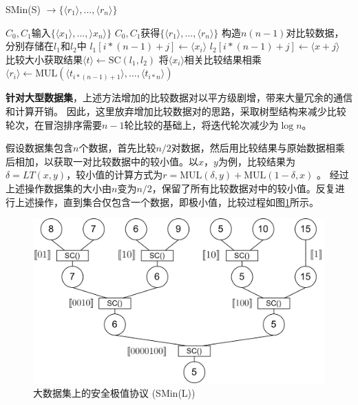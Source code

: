 \begin{algorithm}[htbp]
	\renewcommand{\algorithmicrequire}{\textbf{输入:}}
	\renewcommand{\algorithmicensure}{\textbf{输出:}}
	\caption{SMin(S) $\rightarrow \{\langle r_1 \rangle,...,\langle r_n\rangle\}$}
	\label{alg_smins}
	\begin{algorithmic}[1]
		\REQUIRE $C_0,C_1$输入$ \{\langle x_1 \rangle,...,\rangle x_n\rangle\} $
		\ENSURE $C_0,C_1$获得$\{\langle r_1 \rangle,...,\langle r_n\rangle\}$
		\STATE 构造$ n(n-1) $对比较数据，分别存储在$ l_1 $和$ l_2 $中
		\STATE $ l_1[i*(n-1)+j] \leftarrow \langle x_i \rangle $
		\STATE $ l_2[i*(n-1)+j] \leftarrow \langle x+j \rangle $
		\ENDFOR
		\ENDFOR
		\STATE 比较大小获取结果$ \langle t \rangle \leftarrow \text{SC}(l_1, l_2) $
		\STATE 将$ \langle x_i\rangle $相关比较结果相乘$ \langle r_i \rangle \leftarrow \text{MUL}(\langle t_{i*(n-1)+1}\rangle,...,\langle t_{i*n} \rangle)$
		\ENDFOR
	\end{algorithmic}
\end{algorithm}

\textbf{针对大型数据集}，上述方法增加的比较数据对以平方级剧增，带来大量冗余的通信和计算开销。
因此，这里放弃增加比较数据对的思路，采取树型结构来减少比较轮次，在冒泡排序需要$n-1$轮比较的基础上，将迭代轮次减少为$\log n$。

假设数据集包含$n$个数据，首先比较$n/2$对数据，然后用比较结果与原始数据相乘后相加，以获取一对比较数据中的较小值。以$x$，$y$为例，比较结果为$\delta = LT(x,y) $，较小值的计算方式为$r=\text{MUL}(\delta, y) + \text{MUL}(1-\delta, x)$ 。
经过上述操作数据集的大小由$n$变为$n/2$，保留了所有比较数据对中的较小值。反复进行上述操作，直到集合仅包含一个数据，即极小值，比较过程如图\ref{sminl}所示。
\begin{figure}[htbp]
	\centering
	\includegraphics[scale=0.08]{img/fig1.png}%
	\caption{大数据集上的安全极值协议 (SMin(L))}
	\label{sminl}
\end{figure}
